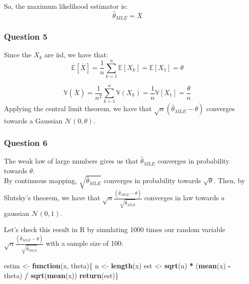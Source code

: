 \documentclass[]{article}
\newenvironment{Shaded}{\begin{snugshade}}{\end{snugshade}}
\newcommand{\ControlFlowTok}[1]{\textcolor[rgb]{0.13,0.29,0.53}{\textbf{#1}}}
\newcommand{\KeywordTok}[1]{\textcolor[rgb]{0.13,0.29,0.53}{\textbf{#1}}}
\newcommand{\NormalTok}[1]{#1}
\newcommand{\OperatorTok}[1]{\textcolor[rgb]{0.81,0.36,0.00}{\textbf{#1}}}
\newcommand{\StringTok}[1]{\textcolor[rgb]{0.31,0.60,0.02}{#1}}
\begin{document}
So, the maximum likelihood estimator is: \[
\hat\theta_{MLE} = \overline{X}
\]

\hypertarget{question-5}{%
\subsubsection{Question 5}\label{question-5}}

Since the \(X_k\) are iid, we have that: \[
\mathbb{E}[\overline{X}] = \frac{1}{n} \sum _{k = 1} ^{n} \mathbb{E} [X_k] = \mathbb{E} [X_1] = \theta
\]

\[
\mathbb{V}(\overline{X}) = \frac{1}{n^2} \sum _{k = 1} ^{n} \mathbb{V} (X_k) = \frac{1}{n} \mathbb{V} [X_1] = \frac {\theta} {n}
\] Applying the central limit theorem, we have that
\(\sqrt{n}(\hat\theta_{MLE}-\theta)\) converges towards a Gaussian
\(\mathcal{N}(0,\theta)\).

\hypertarget{question-6}{%
\subsubsection{Question 6}\label{question-6}}

The weak law of large numbers gives us that \(\hat\theta_{MLE}\)
converges in probability towards \(\theta\).\\
By continuous mapping, \(\sqrt{\hat\theta_{MLE}}\) converges in
probability towards \(\sqrt{\theta}\). Then, by Slutsky's theorem, we
have that
\(\sqrt{n}\frac{(\hat\theta_{MLE}-\theta)}{\sqrt{\hat\theta_{MLE}}}\)
converges in law towards a gaussian \(\mathcal{N}(0,1)\).

Let's check this result in R by simulating 1000 times our random
variable
\(\sqrt{n}\frac{(\hat\theta_{MLE}-\theta)}{\sqrt{\hat\theta_{MLE}}}\)
with a sample size of 100:

\begin{Shaded}
\begin{Highlighting}[]
\NormalTok{estim <-}\StringTok{ }\ControlFlowTok{function}\NormalTok{(x, theta)\{}
\NormalTok{  n <-}\StringTok{ }\KeywordTok{length}\NormalTok{(x)}
\NormalTok{  est <-}\StringTok{ }\KeywordTok{sqrt}\NormalTok{(n) }\OperatorTok{*}\StringTok{ }\NormalTok{(}\KeywordTok{mean}\NormalTok{(x) }\OperatorTok{-}\StringTok{ }\NormalTok{theta) }\OperatorTok{/}\StringTok{ }\KeywordTok{sqrt}\NormalTok{(}\KeywordTok{mean}\NormalTok{(x))}
  \KeywordTok{return}\NormalTok{(est)\}}
\end{Highlighting}
\end{Shaded}
\end{document}
